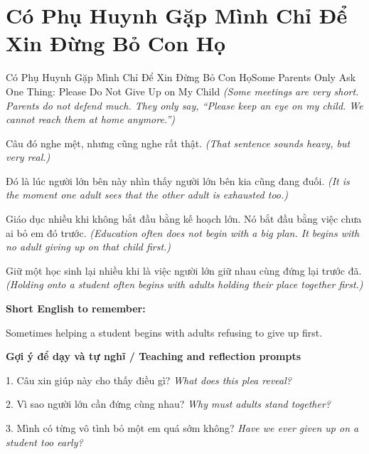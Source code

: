 \section{Có Phụ Huynh Gặp Mình Chỉ Để Xin Đừng Bỏ Con Họ}
\begin{truyen}{Có Phụ Huynh Gặp Mình Chỉ Để Xin Đừng Bỏ Con Họ}{Some Parents Only Ask One Thing: Please Do Not Give Up on My Child}
\textit{(Some meetings are very short. Parents do not defend much. They only say, “Please keep an eye on my child. We cannot reach them at home anymore.”)}

Câu đó nghe mệt, nhưng cũng nghe rất thật.
\textit{(That sentence sounds heavy, but very real.)}

Đó là lúc người lớn bên này nhìn thấy người lớn bên kia cũng đang đuối.
\textit{(It is the moment one adult sees that the other adult is exhausted too.)}

Giáo dục nhiều khi không bắt đầu bằng kế hoạch lớn. Nó bắt đầu bằng việc chưa ai bỏ em đó trước.
\textit{(Education often does not begin with a big plan. It begins with no adult giving up on that child first.)}

\end{truyen}

\begin{baihoc}
Giữ một học sinh lại nhiều khi là việc người lớn giữ nhau cùng đứng lại trước đã.
\textit{(Holding onto a student often begins with adults holding their place together first.)}
\end{baihoc}

\begin{ghinhoanh}
\textbf{Short English to remember:}

Sometimes helping a student begins with adults refusing to give up first.

\end{ghinhoanh}

\begin{tuhocnhanh}
\textbf{Gợi ý để dạy và tự nghĩ / Teaching and reflection prompts}

1. Câu xin giúp này cho thấy điều gì? \textit{What does this plea reveal?}

2. Vì sao người lớn cần đứng cùng nhau? \textit{Why must adults stand together?}

3. Mình có từng vô tình bỏ một em quá sớm không? \textit{Have we ever given up on a student too early?}
\end{tuhocnhanh}
\ngancach

